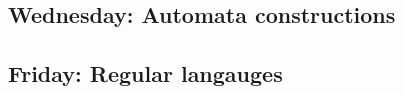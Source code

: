 \newpage
\subsection*{Wednesday: Automata constructions}



\newpage
\subsection*{Friday: Regular langauges}



\newpage
